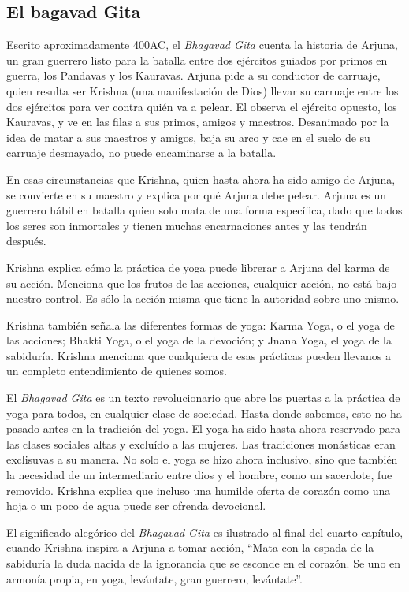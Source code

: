 \subsection{El bagavad Gita}
Escrito aproximadamente 400AC, el \textit{Bhagavad Gita} cuenta la historia de Arjuna, un gran guerrero listo para la batalla entre dos ej\'ercitos guiados por primos en guerra, los Pandavas y los Kauravas. Arjuna pide a su conductor de carruaje, quien resulta ser Krishna (una manifestación de Dios) llevar su carruaje entre los dos ej\'ercitos para ver contra qui\'en va a pelear. El observa el ej\'ercito opuesto, los Kauravas, y ve en las filas a sus primos, amigos y maestros. Desanimado por la idea de matar a sus maestros y amigos, baja su arco y cae en el suelo de su carruaje desmayado, no puede encaminarse a la batalla.

En esas circunstancias que Krishna, quien hasta ahora ha sido amigo de Arjuna, se convierte en su maestro y explica por qu\'e Arjuna debe pelear. Arjuna es un guerrero hábil en batalla quien solo mata de una forma específica, dado que todos los seres son inmortales y tienen muchas encarnaciones antes y las tendrán despu\'es.

Krishna explica cómo la práctica de yoga puede librerar a Arjuna del karma de su acción. Menciona que los frutos de las acciones, cualquier acción, no está bajo nuestro control. Es sólo la acción misma que tiene la autoridad sobre uno mismo.

Krishna tambi\'en señala las diferentes formas de yoga: Karma Yoga, o el yoga de las acciones; Bhakti Yoga, o el yoga de la devoción; y Jnana Yoga, el yoga de la sabiduría. Krishna menciona que cualquiera de esas prácticas pueden llevanos a un completo entendimiento de quienes somos.

El \textit{Bhagavad Gita} es un texto revolucionario que abre las puertas a la práctica de yoga para todos, en cualquier clase de sociedad. Hasta donde sabemos, esto no ha pasado antes en la tradición del yoga. El yoga ha sido hasta ahora reservado para las clases sociales altas y excluído a las mujeres. Las tradiciones monásticas eran exclisuvas a su manera. No solo el yoga se hizo ahora inclusivo, sino que tambi\'en la necesidad de un intermediario entre dios y el hombre, como un sacerdote, fue removido. Krishna explica que incluso una humilde oferta de corazón como una hoja o un poco de agua puede ser ofrenda devocional.

El significado alegórico del \textit{Bhagavad Gita} es ilustrado al final del cuarto capítulo, cuando Krishna inspira a Arjuna a tomar acción, ``Mata con la espada de la sabiduría la duda nacida de la ignorancia que se esconde en el corazón. Se uno en armonía propia, en yoga, levántate, gran guerrero, levántate''.


